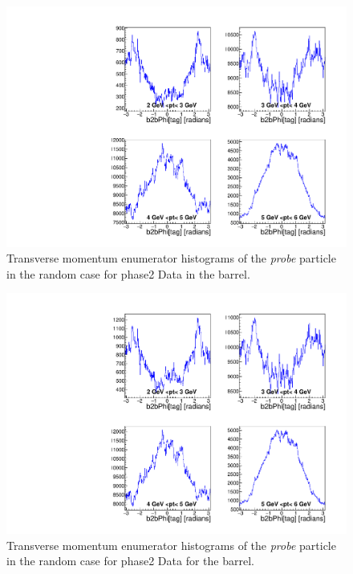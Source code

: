 \documentclass[a4paper,11pt,twosided,final,german,openbib,pdftex,listof=totoc,bibliography=totoc]{scrbook}
\begin{document}
\begin{appendix}
\begin{figure}[!htbp]
	\centering
	\includegraphics[width=\textwidth]{Plots/master/xPtMPhiRandomBarrelE_Data}
	\caption[Transverse Momentum $\phi$ Random Barrel Enumerator Histogram Phase2 Data]{Transverse momentum enumerator histograms of the \textit{probe} particle in the random case for phase2 Data in the barrel.}
	\label{plt:PtMPhiRandomBarrelE_Data}
\end{figure}

\begin{figure}[!htbp]
	\centering
	\includegraphics[width=\textwidth]{Plots/master/xPtMPhiRandomBarrelD_Data}
	\caption[Transverse Momentum $\phi$ Random Barrel Denominator Histogram Phase2 Data]{Transverse momentum enumerator histograms of the \textit{probe} particle in the random case for phase2 Data for the barrel.}
	\label{plt:PtMPhiRandomBarrelD_Data}
\end{figure}






\end{appendix}
\end{document}
